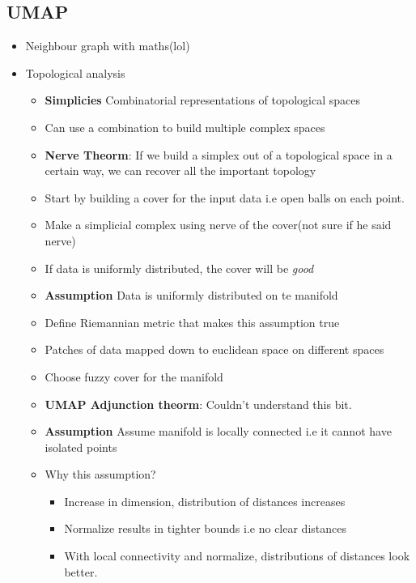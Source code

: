 \documentclass[a4paper]{article}
\begin{document}
\subsection{UMAP}
\begin{itemize}
    \item Neighbour graph with maths(lol)
    \item Topological analysis
        \begin{itemize}
            \item \textbf{Simplicies} Combinatorial representations of topological spaces 
            \item Can use a combination to build multiple complex spaces
            \item \textbf{Nerve Theorm}: If we build a simplex out of a topological space in a certain way, we can recover all the important topology
            \item Start by building a cover for the input data i.e open balls on each point.
            \item Make a simplicial complex using nerve of the cover(not sure if he said nerve)
            \item If data is uniformly distributed, the cover will be \textit{good} 
            \item \textbf{Assumption} Data is uniformly distributed on te manifold 
            \item Define Riemannian metric that makes this assumption true
            \item Patches of data mapped down to euclidean space on different spaces
            \item Choose fuzzy cover for the manifold
            \item \textbf{UMAP Adjunction theorm}: Couldn't understand this bit.  
            \item \textbf{Assumption } Assume manifold is locally connected i.e it cannot have isolated points
            \item Why this assumption?
                \begin{itemize}
                    \item Increase in dimension, distribution of distances increases
                    \item Normalize results in tighter bounds i.e no clear distances
                    \item With local connectivity and normalize, distributions of distances look better.
                \end{itemize}

\end{itemize}
\end{itemize}
\end{document}
